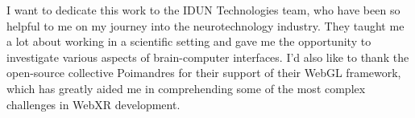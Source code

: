 \begin{dedication}

	I want to dedicate this work to the IDUN Technologies team, who have been so helpful to me on my journey into the neurotechnology industry. They taught me a lot about working in a scientific setting and gave me the opportunity to investigate various aspects of brain-computer interfaces. I'd also like to thank the open-source collective Poimandres for their support of their WebGL framework, which has greatly aided me in comprehending some of the most complex challenges in WebXR development.

\end{dedication}